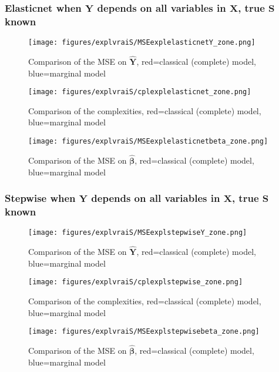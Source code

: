 \documentclass[12pt,a4paper]{report}
\begin{document}
\subsubsection{Elasticnet when $\boldsymbol{Y}$ depends on all variables in $\boldsymbol{X}$, true $\boldsymbol{S}$ known}

	\begin{figure}[h!]
	\centering
		  \texttt{[image: figures/explvraiS/MSEexplelasticnetY\_zone.png]}
		\caption{Comparison of the MSE on $\hat{\boldsymbol{Y}}$, red=classical (complete) model, blue=marginal model}\label{MSEexplelasticnetY_zone}
	\end{figure}
	\begin{figure}[h!]
	\centering
		  \texttt{[image: figures/explvraiS/cplexplelasticnet\_zone.png]}
		\caption{Comparison of the complexities, red=classical (complete) model, blue=marginal model}\label{cplexplelasticnet_zone}
	\end{figure}
	\begin{figure}[h!]
	\centering
		  \texttt{[image: figures/explvraiS/MSEexplelasticnetbeta\_zone.png]}
		\caption{Comparison of the MSE on $\hat{\boldsymbol{\beta}}$, red=classical (complete) model, blue=marginal model}\label{MSEexplelasticnetbeta_zone}
	\end{figure}
	\FloatBarrier
\newpage
\subsubsection{Stepwise when $\boldsymbol{Y}$ depends on all variables in $\boldsymbol{X}$, true $\boldsymbol{S}$ known}

	\begin{figure}[h!]
	\centering
		  \texttt{[image: figures/explvraiS/MSEexplstepwiseY\_zone.png]}
		\caption{Comparison of the MSE on $\hat{\boldsymbol{Y}}$, red=classical (complete) model, blue=marginal model}\label{MSEexplstepwiseY_zone}
	\end{figure}
	\begin{figure}[h!]
	\centering
		  \texttt{[image: figures/explvraiS/cplexplstepwise\_zone.png]}
		\caption{Comparison of the complexities, red=classical (complete) model, blue=marginal model}\label{cplexplstepwise_zone}
	\end{figure}
	\begin{figure}[h!]
	\centering
		  \texttt{[image: figures/explvraiS/MSEexplstepwisebeta\_zone.png]}
		\caption{Comparison of the MSE on $\hat{\boldsymbol{\beta}}$, red=classical (complete) model, blue=marginal model}\label{MSEexplstepwisebeta_zone}
	\end{figure}
	\FloatBarrier
\newpage
\end{document}

